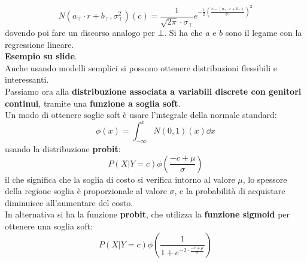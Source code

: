 \documentclass[a4paper,12pt, oneside]{book}
\begin{document}
\[N(a_\top\cdot r+b_\top, \sigma_\top^2)(c)=\frac{1}{\sqrt{2\pi}\cdot
    \sigma_\top}e^{-\frac{1}{2}\left(\frac{c-(a_\top\cdot
        r+b_\top)}{\sigma_\top}\right)^2}\]
dovendo poi fare un discorso analogo per $\bot$. Si ha che $a$ e $b$ sono il
legame con la regressione lineare.\\
\textbf{Esempio su slide}.\\
Anche usando modelli semplici si possono ottenere distribuzioni flessibili e
interessanti. \\
Passiamo ora alla \textbf{distribuzione associata a variabili discrete con
  genitori continui}, tramite una \textbf{funzione a soglia soft}. \\
Un modo di ottenere soglie soft è usare l'integrale della normale standard:
\[\phi(x)=\int_{-\infty}^x N(0,1)(x)\dd{x}\]
usando la distribuzione \textbf{probit}:
\[P(X|Y=c)\phi(\frac{-c+\mu}{\sigma})\]
il che significa che la soglia di costo si verifica intorno al valore $\mu$, lo
spessore della regione soglia è 
proporzionale al valore $\sigma$, e la probabilità di acquistare diminuisce
all’aumentare del costo. \\
In alternativa si ha la funzione \textbf{probit}, che utilizza la
\textbf{funzione sigmoid} per ottenere una soglia soft:
\[P(X|Y=c)\phi(\frac{1}{1+e^{-2\cdot\frac{-c+\mu}{\sigma}}})\]
\end{document}
